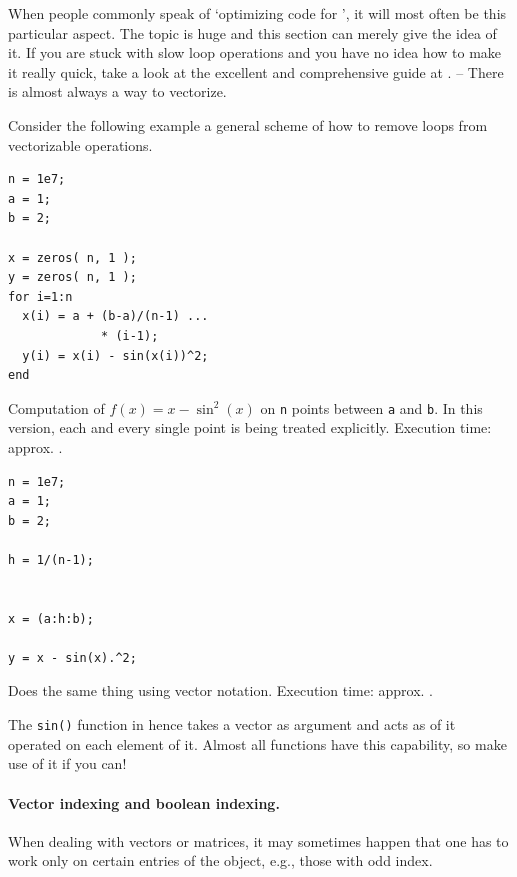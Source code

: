 When people commonly speak of `optimizing code for \matlab{}', it will most
often be this particular aspect. The topic is huge and this section can merely
give the idea of it. If you are stuck with slow loop operations and you have
no idea how to make it really quick, take a look at the excellent and
comprehensive guide at \cite{Mathworks:2009:CVG}. -- There is almost always a
way to vectorize.

Consider the following example a general scheme of how to remove loops from
vectorizable operations.

\hfill
\begin{minipage}[t]{.45\textwidth}
\begin{lstlisting}[framerule=2pt,rulecolor=\color{badred}]
n = 1e7;
a = 1;
b = 2;

x = zeros( n, 1 );
y = zeros( n, 1 );
for i=1:n
  x(i) = a + (b-a)/(n-1) ...
             * (i-1);
  y(i) = x(i) - sin(x(i))^2;
end
\end{lstlisting}
Computation of $f(x)=x-\sin^2(x)$ on \lstinline!n! points between \lstinline!a!
and \lstinline!b!. In this version, each and every single point is being
treated explicitly. Execution time: approx. .
\end{minipage}
\hfill
\begin{minipage}[t]{.45\textwidth}
\begin{lstlisting}[framerule=2pt,rulecolor=\color{goodgreen}]
n = 1e7;
a = 1;
b = 2;

h = 1/(n-1);


x = (a:h:b);

y = x - sin(x).^2;

\end{lstlisting}
Does the same thing using vector notation. Execution time: approx. .
\end{minipage}
\hfill

The \lstinline!sin()! function in \matlab{} hence takes a vector as argument
and acts as of it operated on each element of it. Almost all \matlab{}
functions have this capability, so make use of it if you can!


\paragraph{Vector indexing and boolean indexing.}\label{sec:logicalIndexing}
When dealing with vectors or matrices, it may sometimes happen that one has to
work only on certain entries of the object, e.g., those with odd index.

